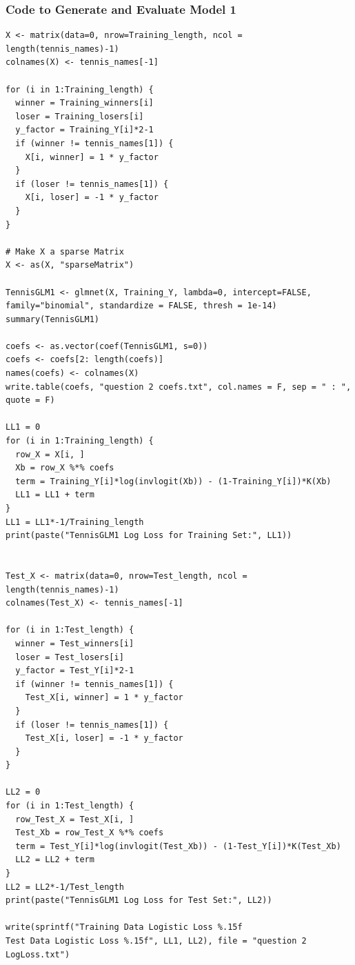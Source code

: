 \documentclass[11pt]{article} %
\begin{document}
\subsubsection*{Code to Generate and Evaluate Model 1}
\begin{lstlisting}
X <- matrix(data=0, nrow=Training_length, ncol = length(tennis_names)-1)
colnames(X) <- tennis_names[-1]

for (i in 1:Training_length) {
  winner = Training_winners[i]
  loser = Training_losers[i]
  y_factor = Training_Y[i]*2-1
  if (winner != tennis_names[1]) {
    X[i, winner] = 1 * y_factor
  }
  if (loser != tennis_names[1]) {
    X[i, loser] = -1 * y_factor
  }
}

# Make X a sparse Matrix
X <- as(X, "sparseMatrix")

TennisGLM1 <- glmnet(X, Training_Y, lambda=0, intercept=FALSE, family="binomial", standardize = FALSE, thresh = 1e-14)
summary(TennisGLM1)

coefs <- as.vector(coef(TennisGLM1, s=0))
coefs <- coefs[2: length(coefs)]
names(coefs) <- colnames(X)
write.table(coefs, "question 2 coefs.txt", col.names = F, sep = " : ", quote = F)

LL1 = 0
for (i in 1:Training_length) {
  row_X = X[i, ]
  Xb = row_X %*% coefs
  term = Training_Y[i]*log(invlogit(Xb)) - (1-Training_Y[i])*K(Xb)
  LL1 = LL1 + term
}
LL1 = LL1*-1/Training_length
print(paste("TennisGLM1 Log Loss for Training Set:", LL1))


Test_X <- matrix(data=0, nrow=Test_length, ncol = length(tennis_names)-1)
colnames(Test_X) <- tennis_names[-1]

for (i in 1:Test_length) {
  winner = Test_winners[i]
  loser = Test_losers[i]
  y_factor = Test_Y[i]*2-1
  if (winner != tennis_names[1]) {
    Test_X[i, winner] = 1 * y_factor
  }
  if (loser != tennis_names[1]) {
    Test_X[i, loser] = -1 * y_factor
  }
}

LL2 = 0
for (i in 1:Test_length) {
  row_Test_X = Test_X[i, ]
  Test_Xb = row_Test_X %*% coefs
  term = Test_Y[i]*log(invlogit(Test_Xb)) - (1-Test_Y[i])*K(Test_Xb)
  LL2 = LL2 + term
}
LL2 = LL2*-1/Test_length
print(paste("TennisGLM1 Log Loss for Test Set:", LL2))

write(sprintf("Training Data Logistic Loss %.15f
Test Data Logistic Loss %.15f", LL1, LL2), file = "question 2 LogLoss.txt")
\end{lstlisting}
\end{document}
